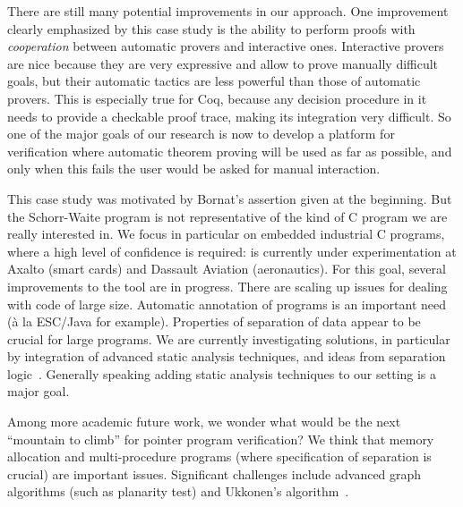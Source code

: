 There are still many potential improvements in our approach. One
improvement clearly emphasized by this case study is the ability to
perform proofs with \emph{cooperation} between automatic provers and
interactive ones. Interactive provers are nice because they are very
expressive and allow to prove manually difficult goals, but their
automatic tactics are less powerful than those of automatic provers. This is
especially true for Coq, because any decision procedure in it needs to
provide a checkable proof trace, making its integration very
difficult. So one of the major goals of our research is now to develop
a platform for verification where automatic theorem proving will be
used as far as possible, and only when this fails the user would be asked
for manual interaction.

This case study was motivated by Bornat's assertion given at the
beginning. But the Schorr-Waite program is not representative of the
kind of C program we are really interested in. We focus in particular
on embedded industrial C programs, where a high level of confidence is
required: \caduceus{} is currently under experimentation at Axalto
(smart cards) and Dassault Aviation (aeronautics). For this goal,
several improvements to the \caduceus{} tool are in progress. There
are scaling up issues for dealing with code of large size. Automatic
annotation of programs is an important need (\`a la ESC/Java for
example). Properties of separation of data appear to be crucial for
large programs. We are currently investigating solutions, in
particular by integration of advanced static analysis techniques, and
ideas from separation logic~\cite{reynolds02lics}. Generally speaking
adding static analysis techniques to our setting is a major goal.

Among more academic future work, we wonder what would be the next
``mountain to climb'' for pointer program verification? We think that
memory allocation and multi-procedure programs (where specification of
separation is crucial) are important issues. Significant challenges
include advanced graph algorithms (such as planarity test) and
Ukkonen's algorithm~\cite{ukkonen95}.



